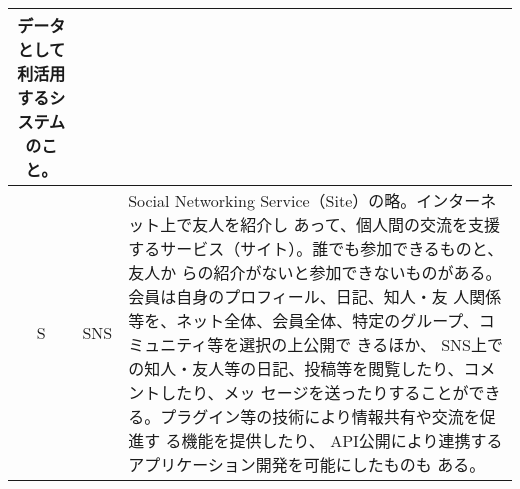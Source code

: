 \begin{table}[htb]
\begin{center}
\begin{tabular}{|c|c|p{12cm}|}
      データとして利活用するシステムのこと。 \\
      \hline
      S &  SNS & Social Networking Service（Site）の略。インターネット上で友人を紹介し
      あって、個人間の交流を支援するサービス（サイト）。誰でも参加できるものと、友人か
      らの紹介がないと参加できないものがある。会員は自身のプロフィール、日記、知人・友
      人関係等を、ネット全体、会員全体、特定のグループ、コミュニティ等を選択の上公開で
      きるほか、 SNS上での知人・友人等の日記、投稿等を閲覧したり、コメントしたり、メッ
      セージを送ったりすることができる。プラグイン等の技術により情報共有や交流を促進す
      る機能を提供したり、 API公開により連携するアプリケーション開発を可能にしたものも
      ある。 \\
      \hline
    \end{tabular}
  \end{center}
\end{table}


